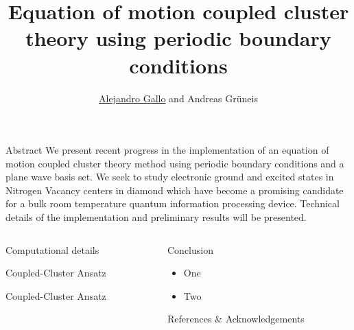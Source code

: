 \documentclass[final]{beamer}
\title{
  Equation of motion coupled cluster theory using periodic boundary conditions
}
\author{\underline{Alejandro Gallo} and Andreas Gr\"uneis}
\institute[]{
  Technical University of Vienna
}
\begin{document}
\begin{frame}[fragile]{}

  \begin{block}{\large Abstract}
    We present recent progress in the implementation of an equation of motion
    coupled cluster theory method using periodic boundary conditions and a plane
    wave basis set.  We seek to study electronic ground and excited states in
    Nitrogen Vacancy centers in diamond which have become a promising candidate
    for a bulk room temperature quantum information processing device. Technical
    details of the implementation and preliminary results will be presented.
  \end{block}
  \begin{columns}[t]
    \begin{column}{.49\linewidth}
      \begin{block}{\large Computational details}
        
      \end{block}
      \begin{block}{\large Coupled-Cluster Ansatz}
        
      \end{block}
      \begin{block}{\large Coupled-Cluster Ansatz}
        
      \end{block}
    \end{column}


    \begin{column}{.49\linewidth}

      \begin{block}{\large Conclusion}
        \begin{itemize}
          \item
            One
          \item
            Two
        \end{itemize}
      \end{block}

      \begin{block}{\large References \& Acknowledgements}
        
      \end{block}

    \end{column}

  \end{columns}

\end{frame}
\end{document}
